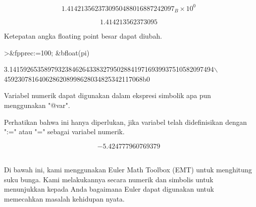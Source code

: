 \begin{eulernotebook}
\begin{eulercomment}
\begin{eulercomment}
\begin{eulerformula}
\[
1.4142135623730950488016887242097_B \times 10^{0}
\]
\end{eulerformula}
\begin{eulerformula}
\[
1.414213562373095
\]
\end{eulerformula}
\begin{eulercomment}
Ketepatan angka floating point besar dapat diubah.
\end{eulercomment}
\begin{eulerprompt}
>&fpprec:=100; &bfloat(pi)
\end{eulerprompt}
\begin{euleroutput}
  
          3.14159265358979323846264338327950288419716939937510582097494\(\backslash\)
  4592307816406286208998628034825342117068b0
  
\end{euleroutput}
\begin{eulercomment}
Variabel numerik dapat digunakan dalam ekspresi simbolik apa pun
menggunakan "@var".

Perhatikan bahwa ini hanya diperlukan, jika variabel telah
didefinisikan dengan ":=" atau "=" sebagai variabel numerik.
\end{eulercomment}
\begin{eulerformula}
\[
-5.424777960769379
\]\\

\end{eulerformula}

\begin{eulercomment}
Di bawah ini, kami menggunakan Euler Math Toolbox (EMT) untuk
menghitung suku bunga. Kami melakukannya secara numerik dan simbolis
untuk menunjukkan kepada Anda bagaimana Euler dapat digunakan untuk
memecahkan masalah kehidupan nyata.


\end{eulercomment}
\end{eulercomment}
\end{eulercomment}
\end{eulernotebook}
